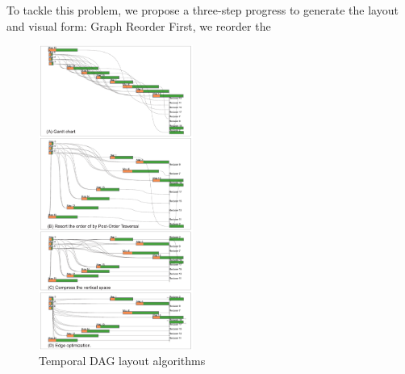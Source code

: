 To tackle this problem, we propose a three-step progress to generate the layout and visual form: Graph Reorder
First, we reorder the 
\begin{figure}[t]
	\centering
	\includegraphics[width=0.45\textwidth]{figures/visualization/exeprogress.pdf}
	\vspace{-3mm}
	\caption{Temporal DAG layout algorithms}
	\label{fig:layout}
	\vspace{-3mm}
\end{figure}

